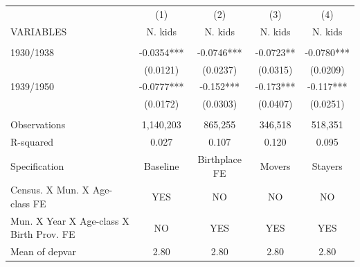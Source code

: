 \begin{tabular}{lcccc} \hline
 & (1) & (2) & (3) & (4) \\
VARIABLES & N. kids & N. kids & N. kids & N. kids \\ \hline
 &  &  &  &  \\
1930/1938 & -0.0354*** & -0.0746*** & -0.0723** & -0.0780*** \\
 & (0.0121) & (0.0237) & (0.0315) & (0.0209) \\
1939/1950 & -0.0777*** & -0.152*** & -0.173*** & -0.117*** \\
 & (0.0172) & (0.0303) & (0.0407) & (0.0251) \\
 &  &  &  &  \\
Observations & 1,140,203 & 865,255 & 346,518 & 518,351 \\
R-squared & 0.027 & 0.107 & 0.120 & 0.095 \\
Specification & Baseline & Birthplace FE & Movers & Stayers \\
Census. X Mun. X Age-class FE & YES & NO & NO & NO \\
Mun. X Year X Age-class X Birth Prov. FE & NO & YES & YES & YES \\
 Mean of depvar & 2.80 & 2.80 & 2.80 & 2.80 \\ \hline
\end{tabular}
